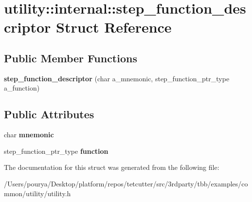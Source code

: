 \hypertarget{structutility_1_1internal_1_1step__function__descriptor}{}\section{utility\+:\+:internal\+:\+:step\+\_\+function\+\_\+descriptor Struct Reference}
\label{structutility_1_1internal_1_1step__function__descriptor}
\subsection*{Public Member Functions}
\begin{DoxyCompactItemize}
\item 
\hypertarget{structutility_1_1internal_1_1step__function__descriptor_a0043f91400a2a791a19e92c465923712}{}{\bfseries step\+\_\+function\+\_\+descriptor} (char a\+\_\+mnemonic, step\+\_\+function\+\_\+ptr\+\_\+type a\+\_\+function)\label{structutility_1_1internal_1_1step__function__descriptor_a0043f91400a2a791a19e92c465923712}

\end{DoxyCompactItemize}
\subsection*{Public Attributes}
\begin{DoxyCompactItemize}
\item 
\hypertarget{structutility_1_1internal_1_1step__function__descriptor_a486143fe78797ba38cd6e8d7dba194dc}{}char {\bfseries mnemonic}\label{structutility_1_1internal_1_1step__function__descriptor_a486143fe78797ba38cd6e8d7dba194dc}

\item 
\hypertarget{structutility_1_1internal_1_1step__function__descriptor_ada43b58ad6fc8505cdd6e4cf5d7e6240}{}step\+\_\+function\+\_\+ptr\+\_\+type {\bfseries function}\label{structutility_1_1internal_1_1step__function__descriptor_ada43b58ad6fc8505cdd6e4cf5d7e6240}

\end{DoxyCompactItemize}


The documentation for this struct was generated from the following file\+:\begin{DoxyCompactItemize}
\item 
/\+Users/pourya/\+Desktop/platform/repos/tetcutter/src/3rdparty/tbb/examples/common/utility/utility.\+h\end{DoxyCompactItemize}
